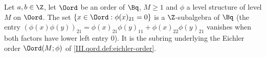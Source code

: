 Let $a,b\in\Z$, let $\Oord$ be an order of $\Bq$, $M\ge1$ and $\phi$ a level structure of level $M$ on $\Oord$. The set $\{x\in\Oord:\phi(x)_{21}=0\}$
is a $\Z$-subalgebra of $\Bq$ (the entry $(\phi(x)\phi(y))_{21}=\phi(x)_{21}\phi(y)_{11}+\phi(x)_{22}\phi(y)_{21}$ vanishes when both factors have lower left entry $0$).
It is the subring underlying the Eichler order $\Oord(M;\phi)$ of \cref{III.qord.def:eichler-order}.
